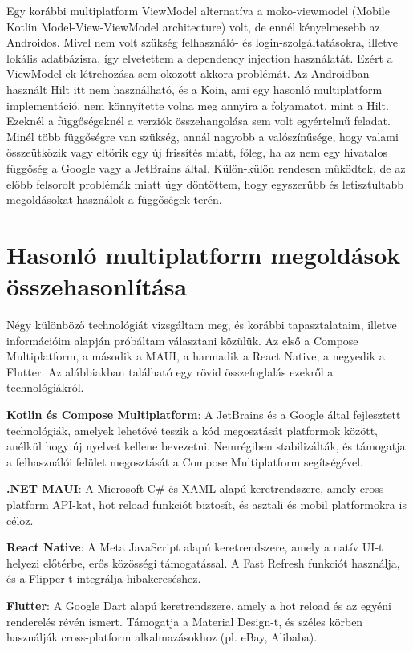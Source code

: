 Egy korábbi multiplatform ViewModel alternatíva a moko-viewmodel (Mobile Kotlin Model-View-ViewModel architecture) volt, de ennél kényelmesebb az Androidos.  
Mivel nem volt szükség felhasználó- és login-szolgáltatásokra, illetve lokális adatbázisra, így elvetettem a dependency injection használatát. Ezért a ViewModel-ek létrehozása sem okozott akkora problémát. Az Androidban használt Hilt itt nem használható, és a Koin, ami egy hasonló multiplatform implementáció, nem könnyítette volna meg annyira a folyamatot, mint a Hilt.  
Ezeknél a függőségeknél a verziók összehangolása sem volt egyértelmű feladat. Minél több függőségre van szükség, annál nagyobb a valószínűsége, hogy valami összeütközik vagy eltörik egy új frissítés miatt, főleg, ha az nem egy hivatalos függőség a Google vagy a JetBrains által.  
Külön-külön rendesen működtek, de az előbb felsorolt problémák miatt úgy döntöttem, hogy egyszerűbb és letisztultabb megoldásokat használok a függőségek terén.

\section{Hasonló multiplatform megoldások összehasonlítása}
\label{sec:SimilarSolutions}

Négy különböző technológiát vizsgáltam meg, és korábbi tapasztalataim, illetve információim alapján próbáltam választani közülük.  
Az első a Compose Multiplatform, a második a MAUI, a harmadik a React Native, a negyedik a Flutter.  
Az alábbiakban található egy rövid összefoglalás ezekről a technológiákról.

\textbf{Kotlin és Compose Multiplatform}: A JetBrains és a Google által fejlesztett technológiák, amelyek lehetővé teszik a kód megosztását platformok között, anélkül hogy új nyelvet kellene bevezetni. Nemrégiben stabilizálták, és támogatja a felhasználói felület megosztását a Compose Multiplatform segítségével. \cite{KotlinCrossPlatformFrameworks}  

\textbf{.NET MAUI}: A Microsoft C\# és XAML alapú keretrendszere, amely cross-platform API-kat, hot reload funkciót biztosít, és asztali és mobil platformokra is céloz. \cite{KotlinCrossPlatformFrameworks}  

\textbf{React Native}: A Meta JavaScript alapú keretrendszere, amely a natív UI-t helyezi előtérbe, erős közösségi támogatással. A Fast Refresh funkciót használja, és a Flipper-t integrálja hibakereséshez. \cite{KotlinCrossPlatformFrameworks}  

\textbf{Flutter}: A Google Dart alapú keretrendszere, amely a hot reload és az egyéni renderelés révén ismert. Támogatja a Material Design-t, és széles körben használják cross-platform alkalmazásokhoz (pl. eBay, Alibaba). \cite{KotlinCrossPlatformFrameworks}  

